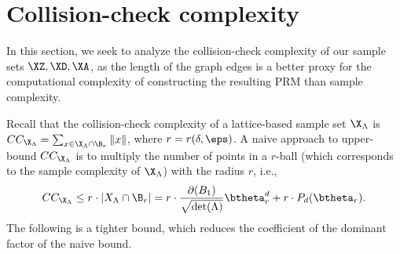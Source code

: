 \section{Collision-check complexity}\label{sec:collision_complexity}
In this section, we seek to analyze the collision-check complexity of our sample sets $\XZ,\XD,\XA$, as the length of the graph edges is a better proxy for the computational complexity of constructing the resulting PRM than sample complexity. 



%




Recall that the collision-check complexity of a lattice-based sample set $\X_\Lambda$  is 
$CC_{\X_\Lambda}=\sum_{x\in \X_\Lambda\cap \B_r}\|x\|$, where $r=r(\delta,\eps)$.
A naive approach to upper-bound $CC_{\X_\Lambda}$ is to multiply the number of points in a $r$-ball (which corresponds to the sample complexity of $\X_\Lambda$) with the radius $r$, i.e.,
\begin{align}
    CC_{\X_\Lambda}\leq r\cdot |X_\Lambda \cap \B_r|=r\cdot \frac{\partial(B_1)}{\sqrt{\det(\Lambda)}}\btheta^d_r + r\cdot P_d(\btheta_r). \label{eq:cc_naive}
\end{align}
The following is a tighter bound, which reduces the coefficient of the dominant factor of the naive bound.  

